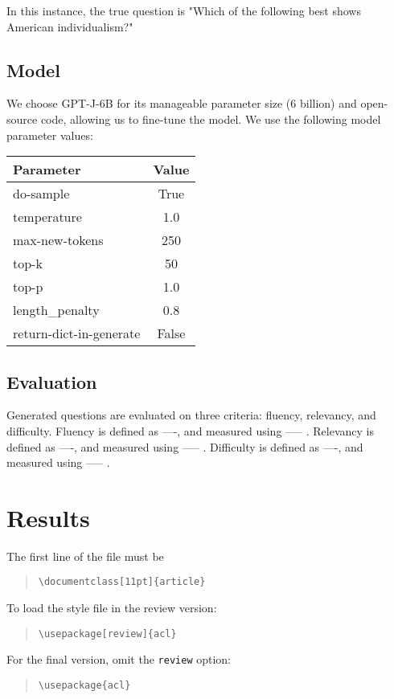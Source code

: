 \documentclass[11pt]{article}
\begin{document}
In this instance, the true question is "Which of the following best shows American individualism?"

\subsection{Model}

We choose GPT-J-6B \citep{gpt-j:4} for its manageable parameter size (6 billion) and open-source code, allowing us to fine-tune the model. We use the following model parameter values: 

\begin{table}[h]
\centering
\begin{tabular}{lc}
\hline
\textbf{Parameter} & \textbf{Value}\\
\hline
do-sample & True \\
temperature & 1.0 \\
max-new-tokens & 250 \\
top-k & 50 \\ 
top-p & 1.0  \\ 
length_penalty & 0.8 \\
return-dict-in-generate & False \\
\hline
\end{tabular}
\end{table}


\subsection{Evaluation}

Generated questions are evaluated on three criteria: fluency, relevancy, and difficulty. Fluency is defined as ----, and measured using ----- . Relevancy is defined as ----, and measured using ----- . Difficulty is defined as ----, and measured using ----- . 

\section{Results}

The first line of the file must be
\begin{quote}
\begin{verbatim}
\documentclass[11pt]{article}
\end{verbatim}
\end{quote}

To load the style file in the review version:
\begin{quote}
\begin{verbatim}
\usepackage[review]{acl}
\end{verbatim}
\end{quote}
For the final version, omit the \verb|review| option:
\begin{quote}
\begin{verbatim}
\usepackage{acl}
\end{verbatim}
\end{quote}
\end{document}
